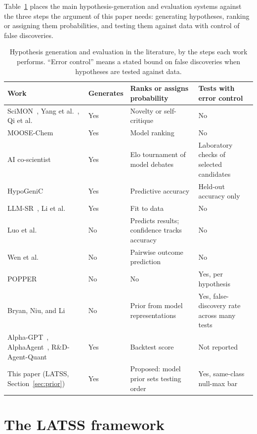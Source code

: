 \documentclass[11pt]{article}
\begin{document}
Table~\ref{tab:litmap} places the main hypothesis-generation and evaluation systems against the three
steps the argument of this paper needs: generating hypotheses, ranking or assigning them probabilities,
and testing them against data with control of false discoveries.

\begin{table}[htbp]
\centering
\caption{Hypothesis generation and evaluation in the literature, by the steps each work performs.
``Error control'' means a stated bound on false discoveries when hypotheses are tested against data.}
\label{tab:litmap}
\small
\begin{tabular}{p{4.6cm} p{1.6cm} p{3.4cm} p{3.6cm}}
\toprule
Work & Generates & Ranks or assigns probability & Tests with error control \\
\midrule
SciMON~\cite{scimon}, Yang et al.~\cite{yangopen}, Qi et al.~\cite{qi2024} & Yes & Novelty or self-critique
& No \\
MOOSE-Chem~\cite{moosechem} & Yes & Model ranking & No \\
AI co-scientist~\cite{coscientist} & Yes & Elo tournament of model debates & Laboratory checks of
selected candidates \\
HypoGeniC~\cite{hypogenic} & Yes & Predictive accuracy & Held-out accuracy only \\
LLM-SR~\cite{llmsr}, Li et al.~\cite{boxloop} & Yes & Fit to data & No \\
Luo et al.~\cite{brainbench} & No & Predicts results; confidence tracks accuracy & No \\
Wen et al.~\cite{predictoutcomes} & No & Pairwise outcome prediction & No \\
POPPER~\cite{falsify} & No & No & Yes, per hypothesis \\
Bryan, Niu, and Li~\cite{bryan} & No & Prior from model representations & Yes, false-discovery rate
across many tests \\
Alpha-GPT~\cite{alphagpt}, AlphaAgent~\cite{alphaagent}, R\&D-Agent-Quant~\cite{rdagent} & Yes & Backtest
score & Not reported \\
This paper (LATSS, Section~\ref{sec:prior}) & Yes & Proposed: model prior sets testing order & Yes,
same-class null-max bar \\
\bottomrule
\end{tabular}
\end{table}

\section{The LATSS framework}
\label{sec:framework}
\end{document}
